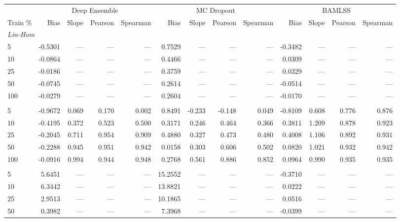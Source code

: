 \begin{tabular}{lrrrrrrrrrrrr}
\toprule
 & \multicolumn{4}{c}{Deep Ensemble} & \multicolumn{4}{c}{MC Dropout} & \multicolumn{4}{c}{BAMLSS} \\
\cmidrule(lr){2-5} \cmidrule(lr){6-9} \cmidrule(lr){10-13}
Train \% & Bias & Slope & Pearson & Spearman & Bias & Slope & Pearson & Spearman & Bias & Slope & Pearson & Spearman \\
\midrule
\multicolumn{13}{l}{\textit{Lin-Hom}} \\
5 & -0.5301 & --- & --- & --- & 0.7529 & --- & --- & --- & -0.3482 & --- & --- & --- \\
10 & -0.0864 & --- & --- & --- & 0.4466 & --- & --- & --- & 0.0309 & --- & --- & --- \\
25 & -0.0186 & --- & --- & --- & 0.3759 & --- & --- & --- & 0.0329 & --- & --- & --- \\
50 & -0.0745 & --- & --- & --- & 0.2614 & --- & --- & --- & -0.0514 & --- & --- & --- \\
100 & -0.0279 & --- & --- & --- & 0.2604 & --- & --- & --- & -0.0170 & --- & --- & --- \\
\addlinespace
\multicolumn{13}{l}{\textit{Lin-Het}} \\
5 & -0.9672 & 0.069 & 0.170 & 0.002 & 0.8491 & -0.233 & -0.148 & 0.049 & -0.8109 & 0.608 & 0.776 & 0.876 \\
10 & -0.4195 & 0.372 & 0.523 & 0.500 & 0.3171 & 0.246 & 0.464 & 0.366 & 0.3811 & 1.209 & 0.878 & 0.923 \\
25 & -0.2045 & 0.711 & 0.954 & 0.909 & 0.4880 & 0.327 & 0.473 & 0.480 & 0.4008 & 1.106 & 0.892 & 0.931 \\
50 & -0.2288 & 0.945 & 0.951 & 0.942 & 0.0158 & 0.303 & 0.606 & 0.502 & 0.0820 & 1.021 & 0.932 & 0.942 \\
100 & -0.0916 & 0.994 & 0.944 & 0.948 & 0.2768 & 0.561 & 0.886 & 0.852 & 0.0964 & 0.990 & 0.935 & 0.935 \\
\addlinespace
\multicolumn{13}{l}{\textit{Sin-Hom}} \\
5 & 5.6451 & --- & --- & --- & 15.2552 & --- & --- & --- & -0.3710 & --- & --- & --- \\
10 & 6.3442 & --- & --- & --- & 13.8821 & --- & --- & --- & 0.0222 & --- & --- & --- \\
25 & 2.9513 & --- & --- & --- & 10.1865 & --- & --- & --- & 0.0516 & --- & --- & --- \\
50 & 0.3982 & --- & --- & --- & 7.3968 & --- & --- & --- & -0.0399 & --- & --- & --- \\

\end{tabular}
